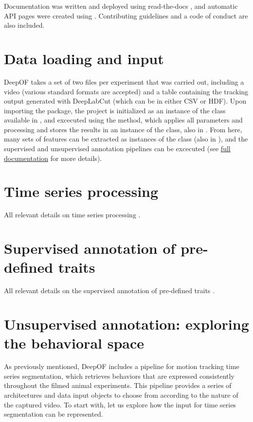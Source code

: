 Documentation was written and deployed using read-the-docs \cite{HomeDocs}, and automatic API pages were created using . Contributing guidelines and a code of conduct are also included.

\section{Data loading and input}

DeepOF takes a set of two files per experiment that was carried out, including a video (various standard formats are accepted) and a table containing the tracking output generated with DeepLabCut (which can be in either CSV or HDF). Upon importing the package, the project is initialized as an instance of the  class available in , and excecuted using the  method, which applies all parameters and processing and stores the results in an instance of the  class, also in . From here, many sets of features can be extracted as instances of the  class (also in ), and the supervised and unsupervised annotation pipelines can be excecuted (see \href{https://deepof.readthedocs.io/en/latest/}{full documentation} for more details).

\section{Time series processing}

All relevant details on time series processing \fullncref. 

\section{Supervised annotation of pre-defined traits}

All relevant details on the supervised annotation of pre-defined traits \fullncref. 

\section{Unsupervised annotation: exploring the behavioral space}

As previously mentioned, DeepOF includes a pipeline for motion tracking time series segmentation, which retrieves behaviors that are expressed consistently throughout the filmed animal experiments. This pipeline provides a series of architectures and data input objects to choose from according to the nature of the captured video. To start with, let us explore how the input for time series segmentation can be represented. 

